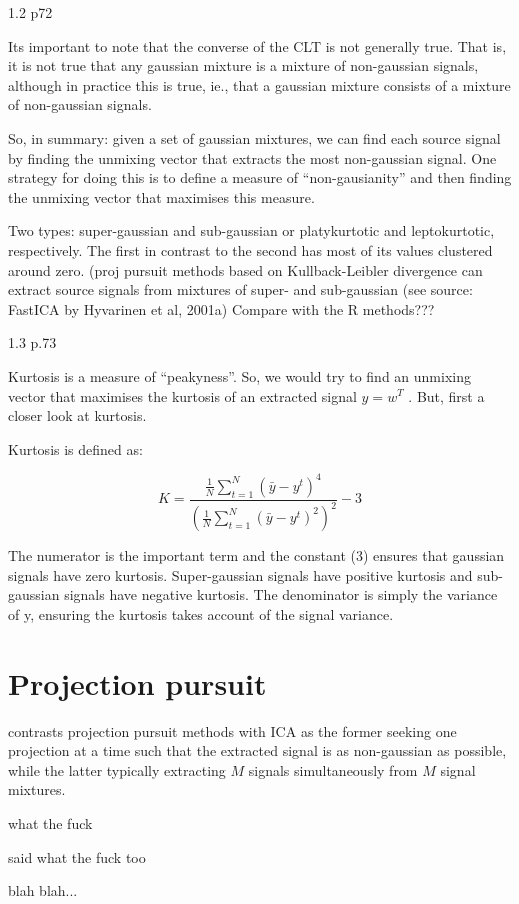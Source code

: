 \documentclass{article}
\begin{document}
1.2 p72

Its important to note that the converse of the CLT is not generally true. That is, it is not true that any gaussian mixture is a mixture of non-gaussian signals, although in practice this is true, ie., that a gaussian mixture consists of a mixture of non-gaussian signals. 

So, in summary: given a set of gaussian mixtures, we can find each source signal by finding the unmixing vector that extracts the most non-gaussian signal. One strategy for doing this is to define a measure of “non-gausianity” and then finding the unmixing vector that maximises this measure.

Two types: super-gaussian and sub-gaussian or platykurtotic and leptokurtotic, respectively. The first in contrast to the second has most of its values clustered around zero. (proj pursuit methods based on Kullback-Leibler divergence can extract source signals from mixtures of super- and sub-gaussian (see source: FastICA by Hyvarinen et al, 2001a) Compare with the R methods???

1.3 p.73

Kurtosis is a measure of “peakyness”. So, we would try to find an unmixing vector that maximises the kurtosis of an extracted signal $y=w^{T}$ . But, first a closer look at kurtosis.

Kurtosis is defined as:

$$K=\frac{\frac{1}{N}\sum_{t=1}^{N}(\bar{y}-y^{t})^{4}}{(\frac{1}{N}\sum_{t=1}^{N}(\bar{y}-y^{t})^{2})^{2}}-3$$

The numerator is the important term and the constant (3) ensures that gaussian signals have zero kurtosis. Super-gaussian signals have positive kurtosis and sub-gaussian signals have negative kurtosis. The denominator is simply the variance of y, ensuring the kurtosis takes account of the signal variance.

\section{Projection pursuit}

\cite{van_rijn_online_2018} contrasts projection pursuit methods with ICA as the former seeking one projection at a time such that the extracted signal is as non-gaussian as possible, while the latter typically extracting $M$ signals simultaneously from $M$ signal mixtures.

\cite{leibig_unsupervised_2016} what the fuck

\cite{bingham_ica_nodate,hofmeyr_ppci:_nodate} said what the fuck too

blah blah... \citep{hyvarinen1999fast}


\cite{bingham_ica_nodate-1}
\end{document}
